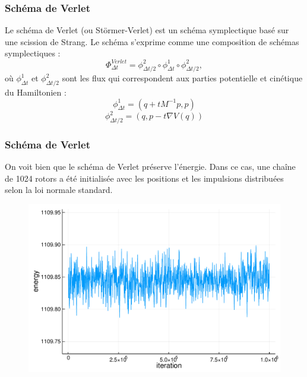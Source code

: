 \begin{frame}

    \frametitle{Schéma de Verlet}

    Le schéma de Verlet (ou Störmer-Verlet) est un schéma symplectique
    basé sur une scission de Strang. Le schéma s'exprime comme une composition
    de schémas symplectiques :
    $$\Phi_{\Delta t}^{Verlet} = \phi_{\Delta t/2}^2 \circ \phi_{\Delta t}^1
    \circ \phi_{\Delta t/2}^2,$$
    où $\phi_{\Delta t}^1$ et $\phi_{\Delta t/2}^2$ sont les flux qui
    correspondent aux parties potentielle et cinétique du Hamiltonien :
    $$\phi_{\Delta t}^1 = (q + t M^{-1} p, p)$$
    $$\phi_{\Delta t/2}^2 = (q, p - t\nabla V(q))$$




\end{frame}





\begin{frame}

    \frametitle{Schéma de Verlet}

    On voit bien que le schéma de Verlet préserve l'énergie. Dans
    ce cas, une chaîne de 1024 rotors a été initialisée avec les
    positions et les impulsions distribuées selon la loi normale
    standard.

    \begin{figure}
        \includegraphics[scale=0.4]{plots/verlet_energy.pdf}
    \end{figure}

\end{frame}

